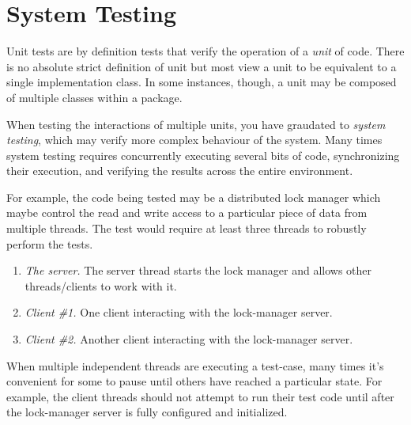 \chapter{System Testing}

Unit tests are by definition tests that verify the operation
of a \emph{unit} of code.  There is no absolute strict definition
of unit but most view a unit to be equivalent to a single 
implementation class.  In some instances, though, a unit may be
composed of multiple classes within a package.  

When testing the interactions of multiple units, you have
graudated to \emph{system testing}, which may verify
more complex behaviour of the system.  Many times system
testing requires concurrently executing several bits of code,
synchronizing their execution, and verifying the results
across the entire environment.

For example, the code being tested may be a distributed
lock manager which maybe control the read and write access
to a particular piece of data from multiple threads. The
test would require at least three threads to robustly
perform the tests.  

\begin{enumerate}
	\item \emph{The server.}  The server thread starts
		the lock manager and allows other threads/clients
		to work with it.
	\item \emph{Client \#1.} One client interacting
		with the lock-manager server.
	\item \emph{Client \#2.} Another client interacting
		with the lock-manager server.
\end{enumerate}

When multiple independent threads are executing a test-case,
many times it's convenient for some to pause until others
have reached a particular state.  For example, the client
threads should not attempt to run their test code until
after the lock-manager server is fully configured and
initialized.


